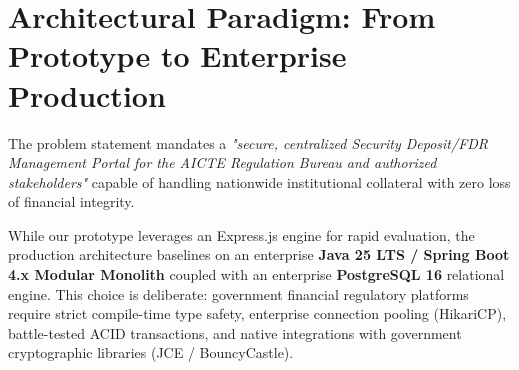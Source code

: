 \documentclass[12pt, a4paper]{report}
\begin{document}
\section{Architectural Paradigm: From Prototype to Enterprise Production}

\begin{connectionbox}
The problem statement mandates a \textit{"secure, centralized Security Deposit/FDR Management Portal for the AICTE Regulation Bureau and authorized stakeholders"} capable of handling nationwide institutional collateral with zero loss of financial integrity.
\end{connectionbox}

While our prototype leverages an Express.js engine for rapid evaluation, the production architecture baselines on an enterprise \textbf{Java 25 LTS / Spring Boot 4.x Modular Monolith} coupled with an enterprise \textbf{PostgreSQL 16} relational engine. This choice is deliberate: government financial regulatory platforms require strict compile-time type safety, enterprise connection pooling (HikariCP), battle-tested ACID transactions, and native integrations with government cryptographic libraries (JCE / BouncyCastle).
\end{document}
